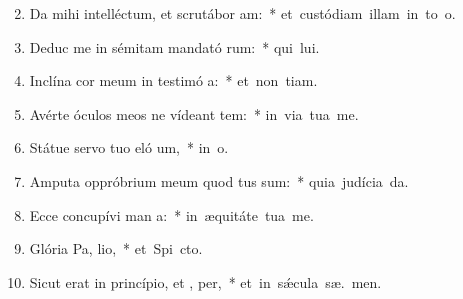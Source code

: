 \begin{flushleft}
\begin{enumerate}[leftmargin=*]
\setcounter{enumi}{1}

\item Da mihi intelléctum, et scrutábor  am:~* \mbox{et custódiam illam in to  o.}
\item Deduc me in sémitam mandató rum:~* \mbox{qui  lui.}
\item Inclína cor meum in testimó a:~* \mbox{et non  tiam.}
\item Avérte óculos meos ne vídeant tem:~* \mbox{in via tua  me.}
\item Státue servo tuo eló um,~* \mbox{in  o.}
\item Amputa oppróbrium meum quod tus sum:~* \mbox{quia judícia  da.}
\item Ecce concupívi man a:~* \mbox{in æquitáte tua  me.}
\item Glória Pa,  lio,~* \mbox{et Spi cto.}
\item Sicut erat in princípio, et ,  per,~* \mbox{et in s\'{\ae}cula sæ. men.}


\end{enumerate}
\end{flushleft}

